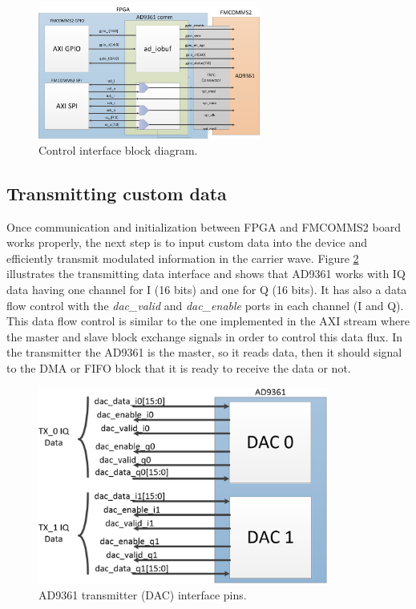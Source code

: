 \begin{figure}[htbp]
    \centering
    \includegraphics[width=0.65\textwidth]{./figures/comm_if}
    \caption{ Control interface block diagram.
    \label{fig:commif}}
\end{figure}

\subsection{Transmitting custom data}

Once communication and initialization between FPGA and FMCOMMS2 board works
properly, the next step is to input custom data into the device and efficiently
transmit modulated information in the carrier wave. Figure \ref{fig:txpins}
illustrates the transmitting data interface and shows that AD9361 works with IQ
data having one channel for I (16 bits) and one for Q (16 bits). It has also a
data flow control with the \emph{dac\_valid} and \emph{dac\_enable} ports in
each channel (I and Q). This data flow control is similar to the one implemented
in the AXI stream \cite{xilinx:axi} where the master and slave block exchange
signals in order to control this data flux. In the transmitter the AD9361 is the
master, so it reads data, then it should signal to the DMA or FIFO block that it
is ready to receive the data or not.

\begin{figure}[htbp]
    \centering
    \includegraphics[width=0.85\textwidth]{./figures/ad9361tx_pins}
    \caption{ AD9361 transmitter (DAC) interface pins.
    \label{fig:txpins}}
\end{figure}

